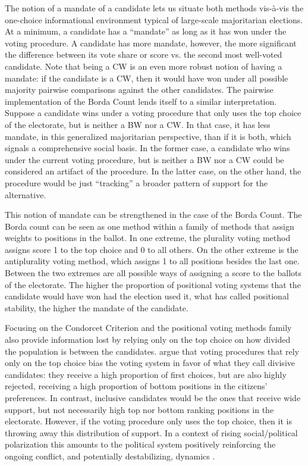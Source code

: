 \documentclass[hidelinks,11pt]{article}
\begin{document}
The notion of a mandate of a candidate lets us situate both methods vis-à-vis
the one-choice informational environment typical of large-scale majoritarian
elections. At a minimum, a candidate has a ``mandate'' as long as it has won
under the voting procedure. A candidate has more mandate, however, the more significant
the difference between its vote share or score vs. the second most well-voted
candidate. Note that being a CW is an even more robust notion of having a mandate: if the
candidate is a CW, then it would have won under all possible majority pairwise
comparisons against the other candidates. The pairwise implementation of the
Borda Count lends itself to a similar interpretation. Suppose a candidate wins under
a voting procedure that only uses the top choice of the electorate, but is
neither a BW nor a CW. In that case, it has less mandate, in this generalized
majoritarian perspective, than if it is both, which signals a
comprehensive social basis. In the former case, a candidate who wins under the
current voting procedure, but is neither a BW nor a CW could be considered an
artifact of the procedure. In the latter case, on the other hand, the procedure
would be just ``tracking'' a broader pattern of support for the alternative.

This notion of mandate can be strengthened in the case of the Borda Count. The Borda count can be seen as one method within a family of methods that assign weights to positions in the ballot. In one extreme, the plurality voting method assigns score 1 to the top choice and 0 to all others. On the other extreme is the antiplurality voting method, which assigns 1 to all positions besides the last one. Between the two extremes are all possible ways of assigning a score to the ballots of the electorate. The higher the proportion of positional voting systems that the candidate would have won had the election used it, what \textcite{tabarrok2001president} has called positional stability, the higher the mandate of the candidate.

Focusing on the Condorcet Criterion and the positional voting methods family
also provide information lost by relying only on the top choice on how divided
the population is between the candidates.
\textcite{igersheim22_compar_votin_method} argue that voting procedures that
rely only on the top choice bias the voting system in favor of what they call
divisive candidates: they receive a high proportion of first choices, but are
also highly rejected, receiving a high proportion of bottom positions in the
citizens' preferences. In contrast, inclusive candidates would be the ones that
receive wide support, but not necessarily high top nor bottom ranking positions
in the electorate. However, if the voting procedure only uses the top choice,
then it is throwing away this distribution of support. In a context of rising
social/political polarization this amounts to the political system positively
reinforcing the ongoing conflict, and potentially destabilizing, dynamics
\parencite{svolik2018polarization, shi2017cultural, Baldassarrie2116863118,
  Axelrode2102139118}.
\end{document}
